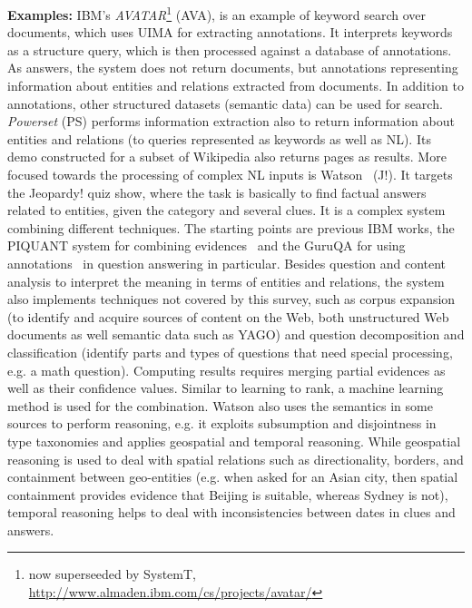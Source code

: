 \textbf{Examples:}
IBM's \emph{AVATAR}\footnote{now superseeded by SystemT, \url{http://www.almaden.ibm.com/cs/projects/avatar/}} (AVA), is an example of keyword search over documents, which uses UIMA for extracting annotations. It interprets keywords as a structure query, which is then processed against a database of annotations. As answers, the system does not return documents, but annotations representing information about entities and relations extracted from documents. In addition to annotations, other structured datasets (semantic data) can be used for search. \emph{Powerset} (PS) performs information extraction also to return information about entities and relations (to queries represented as keywords as well as NL). Its demo constructed for a subset of Wikipedia also returns pages as results. More focused towards the processing of complex NL inputs is Watson~\cite{DBLP:journals/aim/FerrucciBCFGKLMNPSW10} (J!). It targets the Jeopardy! quiz show, where the task is basically to find factual answers related to entities, given the category and several clues. It is a complex system combining different techniques. The starting points are previous IBM works, the PIQUANT system for combining evidences~\cite{DBLP:conf/naacl/Chu-CarrollCPI03} and the GuruQA for using annotations~\cite{DBLP:conf/sigir/PragerBCR00,DBLP:conf/sigir/Chu-CarrollPCFD06} in question answering in particular. Besides question and content analysis to interpret the meaning in terms of entities and relations, the system also implements techniques not covered by this survey, such as corpus expansion (to identify and acquire sources of content on the Web, both unstructured Web documents as well semantic data such as YAGO) and question decomposition and classification (identify parts and types of questions that need special processing, e.g. a math question). Computing results requires merging partial evidences as well as their confidence values. Similar to learning to rank, a machine learning method is used for the combination. Watson also uses the semantics in some sources to perform reasoning, e.g. it exploits subsumption and
disjointness in type taxonomies and applies geospatial and
temporal reasoning. While geospatial reasoning is used
to deal with spatial
relations such as directionality, borders, and
containment between geo-entities (e.g. when asked for an Asian city, then spatial containment
provides evidence that Beijing is suitable, whereas Sydney is not), temporal reasoning helps to deal with 
inconsistencies between dates in clues and answers. 


